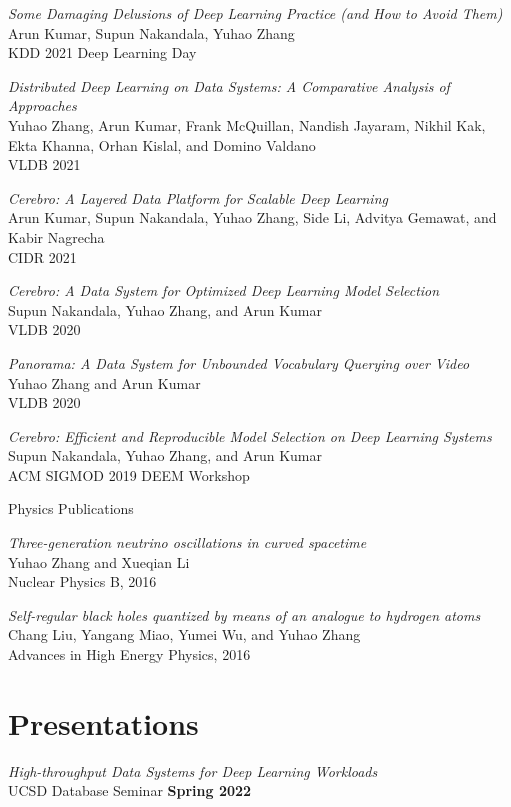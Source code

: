 \documentclass[margin,line]{res}
\begin{document}
\begin{resume}
\textit{Some Damaging Delusions of Deep Learning Practice (and How to Avoid Them)}\\
Arun Kumar, Supun Nakandala, Yuhao Zhang\\
KDD 2021 Deep Learning Day

\textit{Distributed Deep Learning on Data Systems: A Comparative Analysis of Approaches}\\
Yuhao Zhang, Arun Kumar, Frank McQuillan, Nandish Jayaram, Nikhil Kak, Ekta Khanna, Orhan Kislal, and Domino Valdano\\
VLDB 2021

\textit{Cerebro: A Layered Data Platform for Scalable Deep Learning}\\
Arun Kumar, Supun Nakandala, Yuhao Zhang, Side Li, Advitya Gemawat, and Kabir Nagrecha\\
CIDR 2021

\textit{Cerebro: A Data System for Optimized Deep Learning Model Selection}\\
Supun Nakandala, Yuhao Zhang, and Arun Kumar\\
VLDB 2020

\textit{Panorama: A Data System for Unbounded Vocabulary Querying over Video}\\
Yuhao Zhang and Arun Kumar\\
VLDB 2020

\textit{Cerebro: Efficient and Reproducible Model Selection on Deep Learning Systems}\\
Supun Nakandala, Yuhao Zhang, and Arun Kumar\\
ACM SIGMOD 2019 DEEM Workshop

{\sc Physics Publications}

\textit{Three-generation neutrino oscillations in curved spacetime}\\
Yuhao Zhang and Xueqian Li\\
Nuclear Physics B, 2016

\textit{Self-regular black holes quantized by means of an analogue to hydrogen atoms}\\
Chang Liu, Yangang Miao, Yumei Wu, and Yuhao Zhang\\
Advances in High Energy Physics, 2016

\section{\sc Presentations}
\textit{High-throughput Data Systems for Deep Learning Workloads}\\
UCSD Database Seminar \hfill {\bf Spring 2022}


\end{resume}
\end{document}
